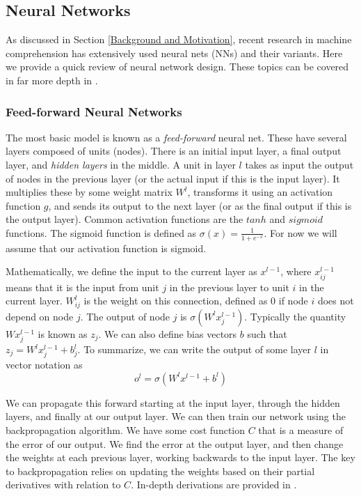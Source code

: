 \documentclass[pageno]{final_paper}
\begin{document}
\subsection{Neural Networks}
\label{Neural Networks}

As discussed in Section \ref{Background and Motivation}, recent research in
machine comprehension has extensively used neural nets (NNs) and their variants.
Here we provide a quick review of neural network design. These topics can be
covered in far more depth in \cite{Bishop1995, Nielsen2015}.

\subsubsection{Feed-forward Neural Networks}
\label{Feed-forward Neural Networks}

The most basic model is known as a \textit{feed-forward} neural net. These have
several layers composed of units (nodes). There is an initial input layer, a
final output layer, and \textit{hidden layers} in the middle. A unit in layer
$l$ takes as input the output of nodes in the previous layer (or the actual
input if this is the input layer). It multiplies these by some weight matrix
$W^l$, transforms it using an activation function $g$, and sends its output to the
next layer (or as the final output if this is the output layer). Common
activation functions are the $tanh$ and $sigmoid$ functions. The sigmoid
function is defined as $\sigma (x) = \frac{1}{1+e^{-x}}$. For now we will assume
that our activation function is sigmoid.

Mathematically, we define the input to the current layer as $x^{l-1}$,
where $x^{l-1}_{ij}$ means that it is the input from unit $j$ in the previous
layer to unit $i$ in the current layer. $W^l_{ij}$ is the weight on this
connection, defined as 0 if node $i$ does not depend on node $j$. The output of
node $j$ is $\sigma ( W^l x^{l-1}_j)$. Typically the quantity $Wx^{l-1}_j$ is
known as $z_j$. We can also define bias vectors $b$ such that $z_j =
W^lx^{l-1}_j + b^l_j$. To summarize, we can write the output of some layer $l$
in vector notation as
$$o^l = \sigma(W^lx^{l-1} + b^l)$$

We can propagate this forward starting at the input layer, through the hidden
layers, and finally at our output layer. We can then train our network using the
backpropagation algorithm. We have some cost function $C$ that is a measure of
the error of our output. We find the error at the output layer, and then change
the weights at each previous layer, working backwards to the input layer. The
key to backpropagation relies on updating the weights based on their partial
derivatives with relation to $C$. In-depth derivations are provided in
\cite{Bishop1995, Nielsen2015}.\\
\end{document}

